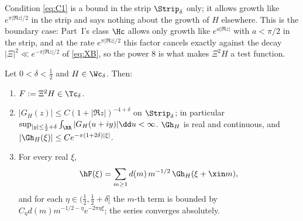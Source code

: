 Condition \eqref{eq:C1} is a bound in the strip $\Strip_\delta$ only; it allows growth like $e^{\pi|\Re z|/2}$ in the strip and says nothing
about the growth of $H$ elsewhere. This is the boundary case: Part~I's class $\Hc$ allows only growth like $e^{a|\Re z|}$ with $a<\pi/2$ in
the strip, and at the rate $e^{\pi|\Re z|/2}$ this factor cancels exactly against the decay $|\Xi|^2\ll e^{-\pi|\Re z|/2}$ of \eqref{eq:XB},
so the power $8$ is what makes $\Xi^2H$ a test function.

\begin{lemma}\label{lem:voronoi}
Let $0<\delta<\frac12$ and $H\in\Wc_\delta$. Then:
\begin{enumerate}[label=\textup{(\alph*)}]
\item $F:=\Xi^2H\in\Tc_\delta$.
\item $|G_H(z)|\le C(1+|\Re z|)^{-4+\delta}$ on $\Strip_\delta$; in particular $\sup_{|y|\le\frac12+\delta}\int_\RR|G_H(u+iy)|\dd u<\infty$.
$\Gh_H$ is real and continuous, and $|\Gh_H(\xi)|\le Ce^{-\pi(1+2\delta)|\xi|}$.
\item For every real $\xi$,
\begin{equation}\label{eq:voronoi}
\hF(\xi)=\sum_{m\ge1}d(m)\,m^{-1/2}\,\Gh_H(\xi+\xin m),
\end{equation}
and for each $\eta\in(\frac12,\frac12+\delta]$ the $m$-th term is bounded by $C_\eta d(m)m^{-1/2-\eta}e^{-2\pi\eta\xi}$; the series converges
absolutely.
\end{enumerate}
\end{lemma}

